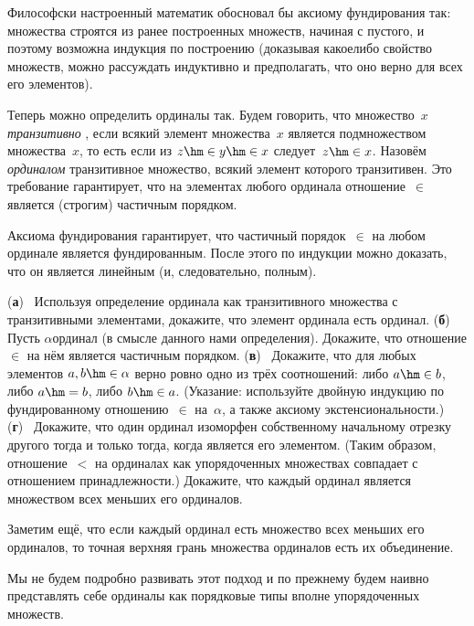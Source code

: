 \problskip
Философски настроенный математик обосновал бы аксиому
фундирования так: множества строятся из ранее построенных
множеств, начиная с пустого, и поэтому возможна индукция по
построению (доказывая какое\д либо свойство множеств, можно
рассуждать индуктивно и предполагать, что оно верно для всех его
элементов).

Теперь можно определить ординалы так. Будем говорить, что
множество~$x$ \emph{транзитивно}%
, если всякий элемент
множества~$x$ является подмножеством множества~$x$, то есть если
из $z\hm\in y\hm\in x$ следует~$z\hm\in x$. Назовём
\emph{ординалом} транзитивное множество, всякий элемент которого
транзитивен. Это требование гарантирует, что на элементах любого
ординала отношение~$\in$ является (строгим)
частичным порядком.

Аксиома фундирования гарантирует, что частичный порядок~$\in$ на
любом ординале является фундированным. После этого
по индукции можно доказать, что он является линейным (и,
следовательно, полным).

\problskip
\begin{problem}
(\textbf{а})~%
Используя определение ординала
как транзитивного множества с транзитивными элементами,
докажите, что элемент ординала есть ординал.
(\textbf{б})~%
Пусть $\alpha$\т ординал (в смысле данного нами определения).
Докажите, что отношение $\in$ на нём является частичным порядком.
(\textbf{в})~%
Докажите, что для любых элементов $a,b\hm\in\alpha$ верно ровно
одно из трёх соотношений: либо $a\hm\in b$, либо $a\hm=b$, либо $b\hm\in
a$. (Указание: используйте двойную
индукцию по фундированному отношению~$\in$
на~$\alpha$, а также аксиому экстенсиональности.)
(\textbf{г})~%
Докажите, что один ординал изоморфен собственному начальному
отрезку другого тогда и только тогда, когда является его элементом.
(Таким образом, отношение~$<$ на ординалах как упорядоченных
множествах совпадает с отношением принадлежности.) Докажите, что
каждый ординал является множеством всех меньших его ординалов.
\end{problem}

\problskip
Заметим ещё, что если каждый ординал есть множество
всех меньших его ординалов, то точная верхняя грань множества
ординалов есть их объединение.

Мы не будем подробно развивать этот подход и по\д
прежнему будем наивно представлять себе ординалы как порядковые
типы вполне упорядоченных множеств.

